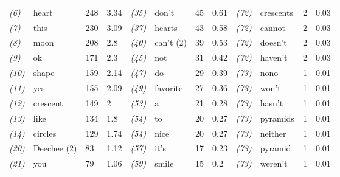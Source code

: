\begin{screenonly}
\begin{table*}[h]
\begin{tabular*}{\hsize}{@{\extracolsep{\fill}}llllllllllll}
    \textsl{(6)} & heart & 248 & 3.34 & \hspace*{2ex}\textsl{(35)} & don't & 45 & 0.61 & \hspace*{2ex}\textsl{(72)} & crescents & 2 & 0.03\\
    \textsl{(7)} & this & 230 & 3.09 & \hspace*{2ex}\textsl{(37)} & hearts & 43 & 0.58 & \hspace*{2ex}\textsl{(72)} & cannot & 2 & 0.03\\
    \textsl{(8)} & moon & 208 & 2.8 & \hspace*{2ex}\textsl{(40)} & can't (2) & 39 & 0.53 & \hspace*{2ex}\textsl{(72)} & doesn't & 2 & 0.03\\
    \textsl{(9)} & ok & 171 & 2.3 & \hspace*{2ex}\textsl{(45)} & not & 31 & 0.42 & \hspace*{2ex}\textsl{(72)} & haven't & 2 & 0.03\\
    \textsl{(10)} & shape & 159 & 2.14 & \hspace*{2ex}\textsl{(47)} & do & 29 & 0.39 & \hspace*{2ex}\textsl{(73)} & nono & 1 & 0.01\\
    \textsl{(11)} & yes & 155 & 2.09 & \hspace*{2ex}\textsl{(49)} & favorite & 27 & 0.36 & \hspace*{2ex}\textsl{(73)} & won't & 1 & 0.01\\
    \textsl{(12)} & crescent & 149 & 2 & \hspace*{2ex}\textsl{(53)} & a & 21 & 0.28 & \hspace*{2ex}\textsl{(73)} & hasn't & 1 & 0.01\\
    \textsl{(13)} & like & 134 & 1.8 & \hspace*{2ex}\textsl{(54)} & to & 20 & 0.27 & \hspace*{2ex}\textsl{(73)} & pyramids & 1 & 0.01\\
    \textsl{(14)} & circles & 129 & 1.74 & \hspace*{2ex}\textsl{(54)} & nice & 20 & 0.27 & \hspace*{2ex}\textsl{(73)} & neither & 1 & 0.01\\
    \textsl{(20)} & Deechee (2) & 83 & 1.12 & \hspace*{2ex}\textsl{(57)} & it's & 17 & 0.23 & \hspace*{2ex}\textsl{(73)} & pyramid & 1 & 0.01\\
    \textsl{(21)} & you & 79 & 1.06 & \hspace*{2ex}\textsl{(59)} & smile & 15 & 0.2 & \hspace*{2ex}\textsl{(73)} & weren't & 1 & 0.01\\

\end{tabular*}
\end{table*}
\end{screenonly}
